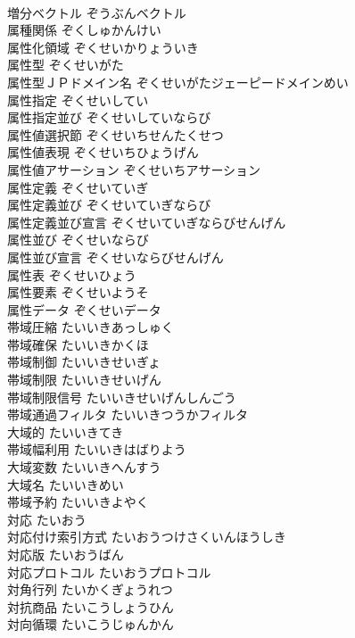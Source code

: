 \documentclass[8pt]{extreport}
\begin{document}
\begin{CJK}{UTF8}{min}
\\	増分ベクトル	ぞうぶんベクトル	
\\	属種関係	ぞくしゅかんけい	
\\	属性化領域	ぞくせいかりょういき	
\\	属性型	ぞくせいがた	
\\	属性型ＪＰドメイン名	ぞくせいがたジェーピードメインめい	
\\	属性指定	ぞくせいしてい	
\\	属性指定並び	ぞくせいしていならび	
\\	属性値選択節	ぞくせいちせんたくせつ	
\\	属性値表現	ぞくせいちひょうげん	
\\	属性値アサーション	ぞくせいちアサーション	
\\	属性定義	ぞくせいていぎ	
\\	属性定義並び	ぞくせいていぎならび	
\\	属性定義並び宣言	ぞくせいていぎならびせんげん	
\\	属性並び	ぞくせいならび	
\\	属性並び宣言	ぞくせいならびせんげん	
\\	属性表	ぞくせいひょう	
\\	属性要素	ぞくせいようそ	
\\	属性データ	ぞくせいデータ	
\\	帯域圧縮	たいいきあっしゅく	
\\	帯域確保	たいいきかくほ	
\\	帯域制御	たいいきせいぎょ	
\\	帯域制限	たいいきせいげん	
\\	帯域制限信号	たいいきせいげんしんごう	
\\	帯域通過フィルタ	たいいきつうかフィルタ	
\\	大域的	たいいきてき	
\\	帯域幅利用	たいいきはばりよう	
\\	大域変数	たいいきへんすう	
\\	大域名	たいいきめい	
\\	帯域予約	たいいきよやく	
\\	対応	たいおう	
\\	対応付け索引方式	たいおうつけさくいんほうしき	
\\	対応版	たいおうばん	
\\	対応プロトコル	たいおうプロトコル	
\\	対角行列	たいかくぎょうれつ	
\\	対抗商品	たいこうしょうひん	
\\	対向循環	たいこうじゅんかん	

\end{CJK}
\end{document}

